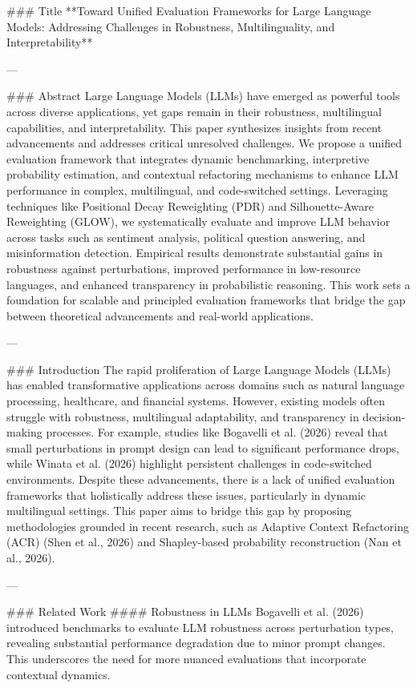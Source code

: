 ### Title
**Toward Unified Evaluation Frameworks for Large Language Models: Addressing Challenges in Robustness, Multilinguality, and Interpretability**

---

### Abstract  
Large Language Models (LLMs) have emerged as powerful tools across diverse applications, yet gaps remain in their robustness, multilingual capabilities, and interpretability. This paper synthesizes insights from recent advancements and addresses critical unresolved challenges. We propose a unified evaluation framework that integrates dynamic benchmarking, interpretive probability estimation, and contextual refactoring mechanisms to enhance LLM performance in complex, multilingual, and code-switched settings. Leveraging techniques like Positional Decay Reweighting (PDR) and Silhouette-Aware Reweighting (GLOW), we systematically evaluate and improve LLM behavior across tasks such as sentiment analysis, political question answering, and misinformation detection. Empirical results demonstrate substantial gains in robustness against perturbations, improved performance in low-resource languages, and enhanced transparency in probabilistic reasoning. This work sets a foundation for scalable and principled evaluation frameworks that bridge the gap between theoretical advancements and real-world applications.

---

### Introduction  
The rapid proliferation of Large Language Models (LLMs) has enabled transformative applications across domains such as natural language processing, healthcare, and financial systems. However, existing models often struggle with robustness, multilingual adaptability, and transparency in decision-making processes. For example, studies like Bogavelli et al. (2026) reveal that small perturbations in prompt design can lead to significant performance drops, while Winata et al. (2026) highlight persistent challenges in code-switched environments. Despite these advancements, there is a lack of unified evaluation frameworks that holistically address these issues, particularly in dynamic multilingual settings. This paper aims to bridge this gap by proposing methodologies grounded in recent research, such as Adaptive Context Refactoring (ACR) (Shen et al., 2026) and Shapley-based probability reconstruction (Nan et al., 2026).

---

### Related Work  
#### Robustness in LLMs  
Bogavelli et al. (2026) introduced benchmarks to evaluate LLM robustness across perturbation types, revealing substantial performance degradation due to minor prompt changes. This underscores the need for more nuanced evaluations that incorporate contextual dynamics. 

